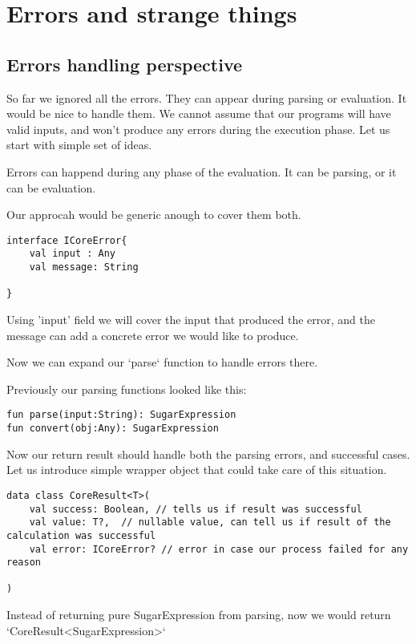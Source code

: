 \documentclass[11pt]{article}
\begin{document}
\section{Errors and strange things}
\label{sec:org45c9457}
\subsection{Errors handling perspective}
\label{sec:org7ef0068}
So far we ignored all the errors. They can appear during parsing or evaluation.
It would be nice to handle them. We cannot assume that our programs will have valid inputs, and won't produce any errors during the execution phase.
Let us start with simple set of ideas.

Errors can happend during any phase of the evaluation. It can be parsing, or it can be evaluation.

Our approcah would be generic anough to cover them both.


\begin{verbatim}
interface ICoreError{
    val input : Any
    val message: String

}
\end{verbatim}

Using 'input' field we will cover the input that produced the error, and the message can add a concrete error we would like to produce.


Now we can expand our `parse` function to handle errors there.

Previously our parsing functions looked like this:
\begin{verbatim}
fun parse(input:String): SugarExpression
fun convert(obj:Any): SugarExpression
\end{verbatim}


Now our return result should handle both the parsing errors, and successful cases.
Let us introduce simple wrapper object that could take care of this situation.


\begin{verbatim}
data class CoreResult<T>(
    val success: Boolean, // tells us if result was successful
    val value: T?,  // nullable value, can tell us if result of the calculation was successful
    val error: ICoreError? // error in case our process failed for any reason

)

\end{verbatim}
Instead of returning pure SugarExpression from parsing, now we would return `CoreResult<SugarExpression>`
\end{document}
